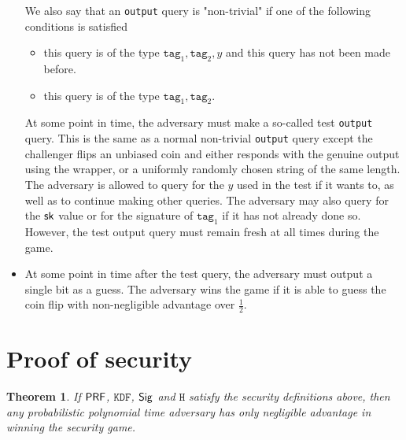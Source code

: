 \documentclass{article}
\newtheorem{theorem}{Theorem}[section]
\begin{document}
\begin{itemize}
We also say that an \texttt{output} query is "non-trivial" if one of the following conditions is satisfied
	
	\begin{itemize}
		\item this query is of the type $\texttt{tag}_1, \texttt{tag}_2, y$ and this query has not been made before. 
		
		\item this query is of the type $\texttt{tag}_1, \texttt{tag}_2$.  
	\end{itemize}
	
	
	At some point in time, the adversary must make a so-called test \texttt{output} query. This is the same as a normal non-trivial \texttt{output} query except the challenger flips an unbiased coin and either responds with the genuine output using the wrapper, or a uniformly randomly chosen string of the same length. The adversary is allowed to query for the $y$ used in the test if it wants to, as well as to continue making other queries. The adversary may also query for the $\mathsf{sk}$ value or for the signature of $\texttt{tag}_1$ if it has not already done so. However, the test output query must remain fresh at all times during the game.
	
\item At some point in time after the test query, the adversary must output a single bit as a guess. The adversary wins the game if it is able to guess the coin flip with non-negligible advantage over $\frac{1}{2}$.
\end{itemize}

\section{Proof of security} \label{proof}

\begin{theorem}
If $\mathsf{PRF}$, $\texttt{KDF}$, $\mathsf{Sig}$ and $\texttt{H}$ satisfy the security definitions above, then any probabilistic polynomial time adversary has only negligible advantage in winning the security game.
\end{theorem}
\end{document}
